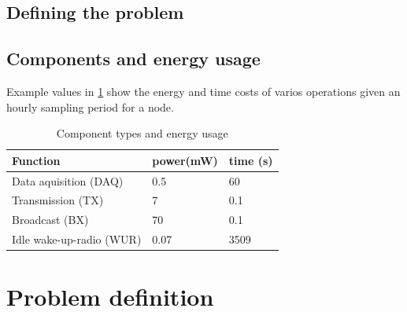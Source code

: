 \subsection{Defining the problem}
\subsection{Components and energy usage}

Example values in \ref{table:components_energy_usage} show the energy and time costs of varios operations given an hourly sampling period for a node.


\begin{table}
\begin{tabular}{p{}p{} p{} }
\hline
Function & power(mW) & time (s) \\
\hline
Data aquisition (DAQ) & 0.5 & 60 \\
Transmission (TX) & 7 & 0.1 \\
Broadcast (BX) & 70 & 0.1 \\
Idle wake-up-radio (WUR) & 0.07 & 3509 \\
\end{tabular}
\caption{Component types and energy usage}
\label{table:components_energy_usage}
\end{table}

\section{Problem definition}

